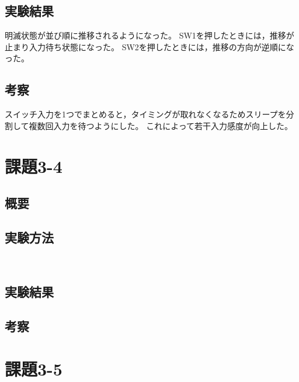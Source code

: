 \documentclass[a4paper,10pt]{jsarticle}
\begin{document}
\subsection{実験結果}
明滅状態が並び順に推移されるようになった。
SW1を押したときには，推移が止まり入力待ち状態になった。
SW2を押したときには，推移の方向が逆順になった。

\subsection{考察}
スイッチ入力を1つでまとめると，タイミングが取れなくなるためスリープを分割して複数回入力を待つようにした。
これによって若干入力感度が向上した。

\section{課題3-4}
\subsection{概要}

\subsection{実験方法}
\begin{lstlisting}[caption={program3-4},label={program3-4}]
  
\end{lstlisting}


\subsection{実験結果}

\subsection{考察}

\section{課題3-5}
\end{document}
